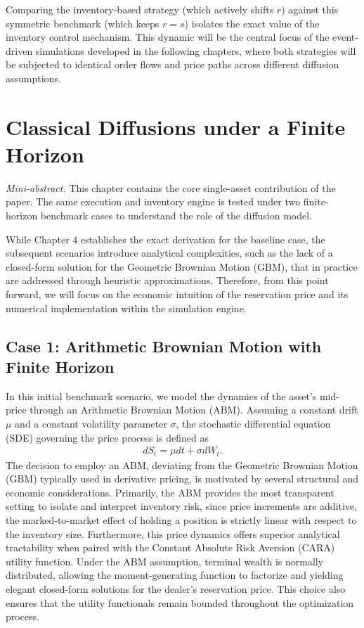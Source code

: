 \documentclass[a4paper,10pt,titlepage,oneside,openany]{book}
\theoremstyle{plain}\newtheorem{theorem}{Theorem}[chapter]
\theoremstyle{definition}\newtheorem{definition}{Definition}[chapter]
\theoremstyle{remark}\newtheorem{remark}{Remark}[chapter]
\newcommand{\miniabstract}[1]{%
\vspace{-2pt}
\begin{tcolorbox}[colback=gray!6,colframe=black!15,boxrule=0.3pt,arc=3pt,left=6pt,right=6pt,top=4pt,bottom=4pt]
\textit{Mini-abstract.} #1
\end{tcolorbox}
\vspace{-4pt}
}
\begin{document}
Comparing the inventory-based strategy (which actively shifts $r$) against this symmetric benchmark (which keeps $r=s$) isolates the exact value of the inventory control mechanism. This dynamic will be the central focus of the event-driven simulations developed in the following chapters, where both strategies will be subjected to identical order flows and price paths across different diffusion assumptions.

\chapter{Classical Diffusions under a Finite Horizon}
\miniabstract{This chapter contains the core single-asset contribution of the paper. The same execution and inventory engine is tested under two finite-horizon benchmark cases to understand the role of the diffusion model.}

While Chapter 4 establishes the exact derivation for the baseline case, the subsequent scenarios introduce analytical complexities, such as the lack of a closed-form solution for the Geometric Brownian Motion (GBM), that in practice are addressed through heuristic approximations. Therefore, from this point forward, we will focus on the economic intuition of the reservation price and its numerical implementation within the simulation engine.

\section{Case 1: Arithmetic Brownian Motion with Finite Horizon}

In this initial benchmark scenario, we model the dynamics of the asset's mid-price through an Arithmetic Brownian Motion (ABM). Assuming a constant drift $\mu$ and a constant volatility parameter $\sigma$, the stochastic differential equation (SDE) governing the price process is defined as
\begin{align*}
    dS_t = \mu dt + \sigma dW_t.
\end{align*}
The decision to employ an ABM, deviating from the Geometric Brownian Motion (GBM) typically used in derivative pricing, is motivated by several structural and economic considerations. Primarily, the ABM provides the most transparent setting to isolate and interpret inventory risk, since price increments are additive, the marked-to-market effect of holding a position is strictly linear with respect to the inventory size. Furthermore, this price dynamics offers superior analytical tractability when paired with the Constant Absolute Risk Aversion (CARA) utility function. Under the ABM assumption, terminal wealth is normally distributed, allowing the moment-generating function to factorize and yielding elegant closed-form solutions for the dealer's reservation price. This choice also ensures that the utility functionals remain bounded throughout the optimization process.
\end{document}

